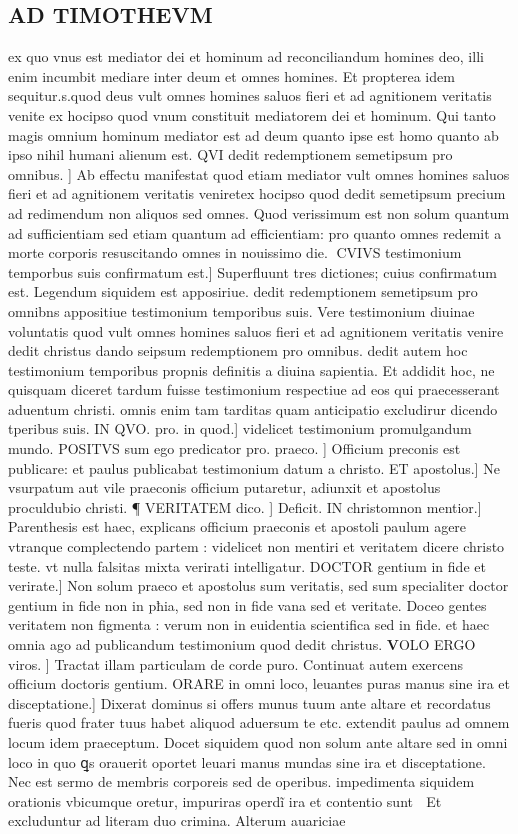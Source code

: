 \documentclass{article}
\begin{document}
\begin{pages}
\section*{AD TIMOTHEVM }\pstart ex quo vnus est mediator dei et hominum ad reconciliandum homines deo, illi enim incumbit mediare inter deum et omnes homines. Et propterea idem sequitur.s.quod deus vult omnes homines saluos fieri et ad agnitionem veritatis venite ex hocipso quod vnum constituit mediatorem dei et hominum. Qui tanto magis omnium hominum mediator est ad deum quanto ipse est homo quanto ab ipso nihil humani alienum est. QVI dedit redemptionem semetipsum pro omnibus. ] Ab effectu manifestat quod etiam mediator vult omnes homines saluos fieri et ad agnitionem veritatis veniretex hocipso quod dedit semetipsum precium ad redimendum non aliquos sed omnes. Quod verissimum est non solum quantum ad sufficientiam sed etiam quantum ad efficientiam: pro quanto omnes redemit a morte corporis resuscitando omnes in nouissimo die. CVIVS testimonium temporbus suis confirmatum est.] Superfluunt tres dictiones; cuius confirmatum est. Legendum siquidem est apposiriue. dedit redemptionem semetipsum pro omnibns appositiue testimonium temporibus suis. Vere testimonium diuinae voluntatis quod vult omnes homines saluos fieri et ad agnitionem veritatis venire dedit christus dando seipsum redemptionem pro omnibus. dedit autem hoc testimonium temporibus propnis definitis a diuina sapientia. Et addidit hoc, ne quisquam diceret tardum fuisse testimonium respectiue ad eos qui praecesserant aduentum christi. omnis enim tam tarditas quam anticipatio excludirur dicendo tperibus suis. IN QVO. pro. in quod.] videlicet testimonium promulgandum mundo. POSITVS sum ego predicator pro. praeco. ] Officium preconis est publicare: et paulus publicabat testimonium datum a christo. ET apostolus.] Ne vsurpatum aut vile praeconis officium putaretur, adiunxit et apostolus proculdubio christi. ¶ VERITATEM dico. ] Deficit. IN christomnon mentior.] Parenthesis est haec, explicans officium praeconis et apostoli paulum agere vtranque complectendo partem : videlicet non mentiri et veritatem dicere christo teste. vt nulla falsitas mixta verirati intelligatur. DOCTOR gentium in fide et verirate.] Non solum praeco et apostolus sum veritatis, sed sum specialiter doctor gentium in fide  non in pħia, sed non in fide vana sed et veritate. Doceo gentes veritatem non figmenta : verum non in euidentia scientifica sed in fide. et haec omnia ago ad publicandum testimonium quod dedit christus.  \pend\pstart \huge\textbf{V}\normalsize OLO ERGO viros. ] Tractat illam particulam de corde puro. Continuat autem exercens officium doctoris gentium. ORARE in omni loco, leuantes puras manus sine ira et disceptatione.] Dixerat dominus si offers munus tuum ante altare et recordatus fueris quod frater tuus habet aliquod aduersum te etc.  extendit paulus ad omnem locum idem praeceptum. Docet siquidem quod non solum ante altare sed in omni loco in quo ꝗs orauerit oportet leuari manus mundas sine ira et disceptatione. Nec est sermo de membris corporeis sed de operibus. impedimenta siquidem orationis vbicumque oretur, impuriras operdĩ ira et contentio sunt  Et excluduntur ad literam duo crimina. Alterum auariciae 
\end{pages}
\end{document}
